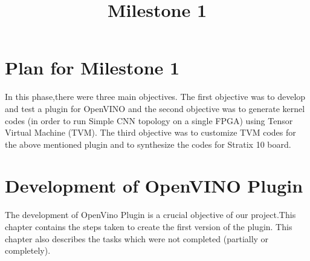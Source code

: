 \documentclass[titlepage]{report}
\title{\textbf{Milestone 1}}
\begin{document}
\maketitle

\tableofcontents{}
\newpage

\chapter{Plan for Milestone 1}
In this phase,there were three main objectives. The first objective was to develop and test a plugin for OpenVINO and the second objective was to generate kernel codes (in order to run Simple CNN topology on a single FPGA) using Tensor Virtual Machine (TVM). 
The third objective was to customize TVM codes for the above mentioned plugin and to synthesize the codes for Stratix 10 board.



\chapter{Development of OpenVINO Plugin}
The development of OpenVino Plugin is a crucial objective of our project.This chapter contains the steps taken to create the first version of the plugin. This chapter also describes the tasks which were not completed (partially or completely). 
\end{document}
